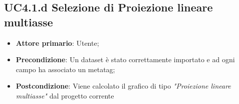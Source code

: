 \subsection{UC4.1.d Selezione di Proiezione lineare multiasse}

\begin{itemize}

    \item \textbf{Attore primario}: Utente;

    \item \textbf{Precondizione}:   Un dataset è stato correttamente importato e ad ogni campo ha associato
                                    un metatag;

    \item \textbf{Postcondizione}:  Viene calcolato il grafico di tipo \emph{"Proiezione lineare multiasse"} dal progetto corrente
  
\end{itemize}


